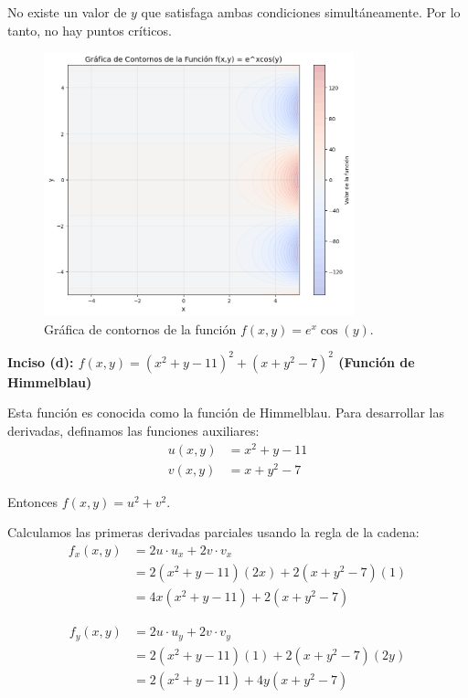 \documentclass{article}
\begin{document}
No existe un valor de $y$ que satisfaga ambas condiciones simultáneamente. Por lo tanto, no hay puntos críticos.

\begin{figure}[h]
\centering
\includegraphics[width=0.8\textwidth]{images/6c_plot.png}
\caption{Gráfica de contornos de la función $f(x,y) = e^{x}\cos(y)$.}
\label{fig:6a_contour}
\end{figure}

\textbf{Inciso (d): $f(x,y) = (x^{2} + y - 11)^{2} + (x + y^{2} - 7)^{2}$ (Función de Himmelblau)}

Esta función es conocida como la función de Himmelblau. Para desarrollar las derivadas, definamos las funciones auxiliares:
\begin{align}
u(x,y) &= x^2 + y - 11 \\
v(x,y) &= x + y^2 - 7
\end{align}

Entonces $f(x,y) = u^2 + v^2$.

Calculamos las primeras derivadas parciales usando la regla de la cadena:
\begin{align}
f_x(x,y) &= 2u \cdot u_x + 2v \cdot v_x \\
&= 2(x^2 + y - 11)(2x) + 2(x + y^2 - 7)(1) \\
&= 4x(x^2 + y - 11) + 2(x + y^2 - 7)
\end{align}

\begin{align}
f_y(x,y) &= 2u \cdot u_y + 2v \cdot v_y \\
&= 2(x^2 + y - 11)(1) + 2(x + y^2 - 7)(2y) \\
&= 2(x^2 + y - 11) + 4y(x + y^2 - 7)
\end{align}
\end{document}
